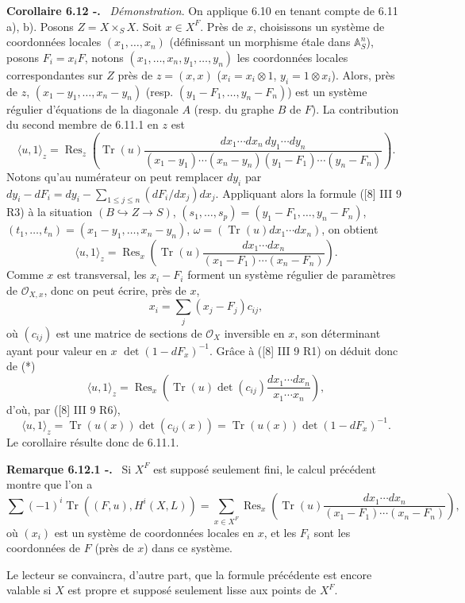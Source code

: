 \documentclass[11pt]{article}
\newenvironment{statement}[1]{\par\medskip\noindent\textbf{#1.}\ }{\par\medskip}
\providecommand{\OO}{\mathcal{O}}
\begin{document}
\begin{statement}{Corollaire 6.12 -}
\emph{Démonstration}. On applique 6.10 en tenant compte de 6.11 a), b). Posons $Z=X\times_S X$. Soit $x\in X^F$. Près de $x$, choisissons un système de coordonnées locales $(x_1,\ldots,x_n)$ (définissant un morphisme étale dans $\mathbb A_S^n$), posons $F_i=x_iF$, notons $(x_1,\ldots,x_n,y_1,\ldots,y_n)$ les coordonnées locales correspondantes sur $Z$ près de $z=(x,x)$ ($x_i=x_i\otimes1$, $y_i=1\otimes x_i$). Alors, près de $z$, $(x_1-y_1,\ldots,x_n-y_n)$ (resp. $(y_1-F_1,\ldots,y_n-F_n)$) est un système régulier d'équations de la diagonale $A$ (resp. du graphe $B$ de $F$). La contribution du second membre de 6.11.1 en $z$ est
\[
\langle u,1\rangle_z=
\operatorname{Res}_z\left(\operatorname{Tr}(u)\frac{dx_1\cdots dx_n\,dy_1\cdots dy_n}{(x_1-y_1)\cdots(x_n-y_n)(y_1-F_1)\cdots(y_n-F_n)}\right).
\]
Notons qu'au numérateur on peut remplacer $dy_i$ par $dy_i-dF_i=dy_i-\sum_{1\le j\le n}(dF_i/dx_j)dx_j$. Appliquant alors la formule ([8] III 9 R3) à la situation $(B\hookrightarrow Z\to S)$, $(s_1,\ldots,s_p)=(y_1-F_1,\ldots,y_n-F_n)$, $(t_1,\ldots,t_n)=(x_1-y_1,\ldots,x_n-y_n)$, $\omega=(\operatorname{Tr}(u)dx_1\cdots dx_n)$, on obtient
\begin{equation}
\tag{*}
\langle u,1\rangle_z=
\operatorname{Res}_x\left(\operatorname{Tr}(u)\frac{dx_1\cdots dx_n}{(x_1-F_1)\cdots(x_n-F_n)}\right).
\end{equation}
Comme $x$ est transversal, les $x_i-F_i$ forment un système régulier de paramètres de $\OO_{X,x}$, donc on peut écrire, près de $x$,
\[
x_i=\sum_j(x_j-F_j)c_{ij},
\]
où $(c_{ij})$ est une matrice de sections de $\OO_X$ inversible en $x$, son déterminant ayant pour valeur en $x$ $\det(1-dF_x)^{-1}$. Grâce à ([8] III 9 R1) on déduit donc de (*)
\[
\langle u,1\rangle_z=\operatorname{Res}_x\left(\operatorname{Tr}(u)\det(c_{ij})\frac{dx_1\cdots dx_n}{x_1\cdots x_n}\right),
\]
d'où, par ([8] III 9 R6),
\[
\langle u,1\rangle_z=\operatorname{Tr}(u(x))\det(c_{ij}(x))=\operatorname{Tr}(u(x))\det(1-dF_x)^{-1}.
\]
Le
corollaire résulte donc de 6.11.1.
\end{statement}

\begin{statement}{Remarque 6.12.1 -}
Si $X^F$ est supposé seulement fini, le calcul précédent montre que l'on a
\[
\sum(-1)^i\operatorname{Tr}((F,u),H^i(X,L))=
\sum_{x\in X^F}\operatorname{Res}_x\left(\operatorname{Tr}(u)\frac{dx_1\cdots dx_n}{(x_1-F_1)\cdots(x_n-F_n)}\right),
\]
où $(x_i)$ est un système de coordonnées locales en $x$, et les $F_i$ sont les coordonnées de $F$ (près de $x$) dans ce système.

Le lecteur se convaincra, d'autre part, que la formule précédente est encore valable si $X$ est propre et supposé seulement lisse aux points de $X^F$.
\end{statement}
\end{document}
